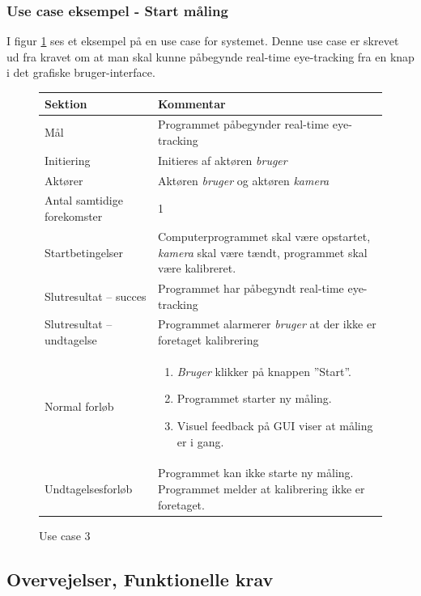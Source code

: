 \documentclass[rapport.tex]{subfiles}
\begin{document}
		\subsubsection{Use case eksempel - Start måling}
		I figur \ref{fig:UseCase3} ses et eksempel på en use case for systemet. Denne use case er skrevet ud fra kravet om at man skal kunne påbegynde real-time eye-tracking fra en knap i det grafiske bruger-interface.
		
		\begin{figure}
		\caption{Use case 3}
		\label{fig:UseCase3}
		\begin{tabular}{|l|p{7.7cm}|}
			\hline \textbf{Sektion} 	& \textbf{Kommentar} \\ 
			\hline Mål  & Programmet påbegynder real-time eye-tracking \\ 
			\hline Initiering  & Initieres af aktøren \textit{bruger} \\ 
			\hline Aktører & Aktøren \textit{bruger} og aktøren \textit{kamera} \\ 
			\hline Antal samtidige forekomster & 1 \\ 
			\hline Startbetingelser & Computerprogrammet skal være opstartet, \textit{kamera} skal være tændt, programmet skal være kalibreret. \\ 
			\hline Slutresultat – succes & Programmet har påbegyndt real-time eye-tracking\\ 
			\hline Slutresultat – undtagelse & Programmet alarmerer \textit{bruger} at der ikke er foretaget kalibrering \\ 
			\hline Normal forløb & \begin{enumerate}
				\item \textit{Bruger} klikker på knappen ”Start”.
				\item Programmet starter ny måling.
				\item Visuel feedback på GUI viser at måling er i gang.
			\end{enumerate} \\  
			\hline Undtagelsesforløb & Programmet kan ikke starte ny måling. Programmet melder
			at kalibrering ikke er foretaget.\\
			\hline 
		\end{tabular}
		\end{figure}
		
	\subsection{Overvejelser, Funktionelle krav}	
	
\end{document}
